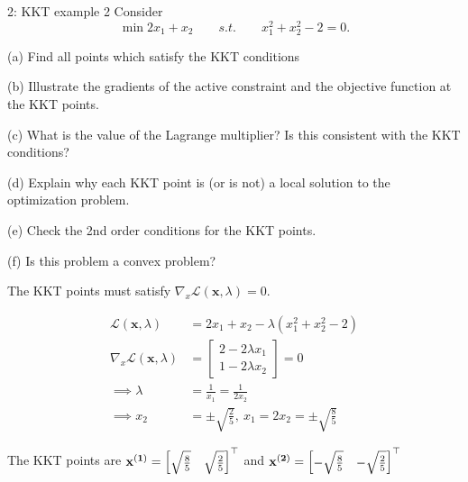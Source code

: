 
\begin{problem}{2: KKT example 2}
Consider
\[
  \min 2x_1 + x_2 \qquad s.t. \qquad x_1^2 + x_2^2 - 2 = 0
  .\]

(a) Find all points which satisfy the KKT conditions

\medskip

(b) Illustrate the gradients of the active constraint and the objective function at the KKT points.

\medskip

(c) What is the value of the Lagrange multiplier? Is this consistent with the KKT conditions?

\medskip

(d) Explain why each KKT point is (or is not) a local solution to the optimization problem.

\medskip

(e) Check the 2nd order conditions for the KKT points.

\medskip

(f) Is this problem a convex problem?

\end{problem}




The KKT points must satisfy $\nabla _x \mathcal{L}(\mathbf{x}, \lambda) = 0$.

\begin{align*}
  \mathcal{L}(\mathbf{x}, \lambda)           & = 2x_1 + x_2 - \lambda(x_1^2 + x_2^2 - 2)                         \\
  \nabla _x \mathcal{L}(\mathbf{x}, \lambda) & =
  \begin{bmatrix}
    2 - 2\lambda x_1 \\
    1 - 2\lambda x_2
  \end{bmatrix} = 0                                                                                              \\
  \implies \lambda                           & = \frac{1}{x_1} = \frac{1}{2x_2}                                  \\
  \implies x_2                               & = \pm \sqrt{ \frac{2}{5}},\  x_1 = 2x_2 = \pm \sqrt{ \frac{8}{5}}
\end{align*}

The KKT points are $\mathbf{x^{(1)}} = \begin{bmatrix} \sqrt{ \frac{8}{5}} & \sqrt{ \frac{2}{5}} \end{bmatrix}^{\top}$ and $\mathbf{x^{(2)}} = \begin{bmatrix} -\sqrt{ \frac{8}{5}} & -\sqrt{ \frac{2}{5}} \end{bmatrix}^{\top}$

